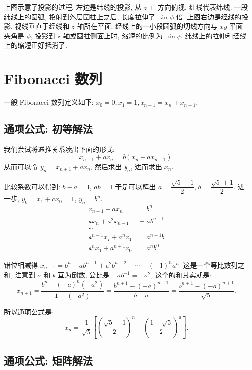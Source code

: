 上图示意了投影的过程. 左边是纬线的投影, 从 $z+$ 方向俯视, 红线代表纬线. 一段纬线上的圆弧, 投射到外层圆柱上之后, 长度拉伸了 $\sin\phi$ 倍. 上图右边是经线的投影, 视线垂直于经线和 $z$ 轴所在平面. 经线上的一小段圆弧的切线方向与 $xy$ 平面夹角是 $\phi$, 投影到 $z$ 轴或圆柱侧面上时, 缩短的比例为 $\sin\phi$. 纬线上的拉伸和经线上的缩短正好抵消了.

\newpage
\section{Fibonacci 数列}

一般 Fibonacci 数列定义如下: $x_0 = 0, x_1 = 1, x_{n+1} = x_{n} + x_{n-1} $.

\subsection{通项公式: 初等解法}

我们尝试将递推关系凑出下面的形式: 
\[ x_{n+1} + ax_n = b(x_n+ax_{n-1}) .\]
从而可以令 $ y_n = x_{n+1} + ax_n $, 然后求出 $ y_n $, 进而求出 $ x_n $.

比较系数可以得到: $ b - a = 1 $, $ ab = 1 $.于是可以解出 $ a = \dfrac{\sqrt{5}-1}{2}$, $ b = \dfrac{\sqrt{5}+1}{2}$.
进一步, $y_0 = x_1+ax_0 = 1 $, $ y_n = b^n $.
\begin{align*} 
x_{n+1}+ax_n &= b^n \\
ax_n+a^2x_{n-1} &= ab^{n-1} \\
\cdots & \\
a^{n-1}x_2 + a^{n}x_1 &= a^{n-1}b \\
a^{n}x_1 + a^{n+1}x_0 &= a^nb^{0}
\end{align*}

错位相减得 $ x_{n+1} = b^n - ab^{n-1} + a^2b^{n-2} - \cdots + (-1)^na^n $. 这是一个等比数列之和, 注意到 $ a $ 和 $ b $ 互为倒数, 公比是 $ -ab^{-1}=-a^2 $, 这个的和其实就是:
\[ x_{n+1} = \frac{b^n-(-a)^n(-a^2)}{1-(-a^2)} = \frac{b^{n+1}-(-a)^{n+1}}{b+a} = \frac{b^{n+1}-(-a)^{n+1}}{\sqrt{5}}.\]

所以通项公式是: 
\[ x_n = \frac{1}{\sqrt{5}}\left[ \left(\frac{\sqrt{5}+1}{2}\right)^n - \left(\frac{1-\sqrt{5}}{2}\right)^n \right] .\]

\subsection{通项公式: 矩阵解法}

